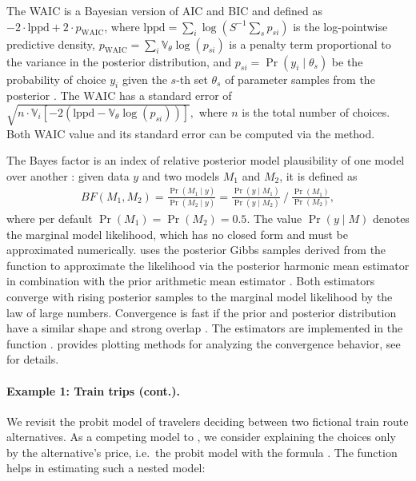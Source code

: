 \documentclass[article]{jss}
\newcommand{\fct}[1]{\code{#1()}}
\begin{document}
The WAIC is a Bayesian version of AIC and BIC and defined as $-2 \cdot \text{lppd} + 2\cdot p_\text{WAIC}$, where $\text{lppd} = \sum_i \log \left( S^{-1} \sum_s p_{si} \right)$ is the log-pointwise predictive density, $p_\text{WAIC} = \sum_i \mathbb{V}_{\theta} \log (p_{si})$ is a penalty term proportional to the variance in the posterior distribution, and $p_{si} = \Pr(y_i\mid \theta_s)$ be the probability of choice $y_i$ given the $s$-th set $\theta_s$ of parameter samples from the posterior \citep[p.\ 220]{McElreath:2016}. The $\text{WAIC}$ has a standard error of $\sqrt{n \cdot \mathbb{V}_i \left[-2 \left(\text{lppd} - \mathbb{V}_{\theta} \log (p_{si}) \right)\right]},$ where $n$ is the total number of choices. Both WAIC value and its standard error can be computed via the \fct{WAIC} method.

The Bayes factor is an index of relative posterior model plausibility of one model over another \citep{Marin:2014}: given data $y$ and two models $M_1$ and $M_2$, it is defined as
\begin{align*}
BF(M_1,M_2) = \frac{\Pr(M_1 \mid y)}{\Pr(M_2 \mid y)} = \frac{\Pr(y \mid M_1 )}{\Pr(y \mid M_2)}~/~\frac{\Pr(M_1)}{\Pr(M_2)},
\end{align*}
where per default $\Pr(M_1) = \Pr(M_2) = 0.5$. The value $\Pr(y \mid M)$ denotes the marginal model likelihood, which has no closed form and must be approximated numerically.  uses the posterior Gibbs samples derived from the \fct{fit\_model} function to approximate the likelihood via the posterior harmonic mean estimator \citep{Newton:1994} in combination with the prior arithmetic mean estimator \citep{Hammersley:1964}. Both estimators converge with rising posterior samples to the marginal model likelihood by the law of large numbers. Convergence is fast if the prior and posterior distribution have a similar shape and strong overlap \citep{Gronau:2017}. The estimators are implemented in the function .  provides plotting methods for analyzing the convergence behavior, see  for details.

\paragraph{Example 1: Train trips (cont.).}

We revisit the probit model of travelers deciding between two fictional train route alternatives. As a competing model to , we consider explaining the choices only by the alternative's price, i.e.\ the probit model with the formula . The \fct{nested\_model} function helps in estimating such a nested model:
\end{document}
